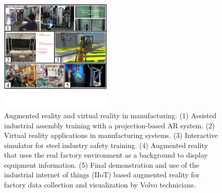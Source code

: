 \documentclass[a4paper,fleqn]{cas-dc}
\begin{document}
\begin{figure}[pos=htb]
	\centering
	\includegraphics[width=0.48\textwidth]{Images/imageandvideo2.pdf}
	\vspace{-5.5em}
	\caption{Augmented reality and virtual reality in manufacturing. (1) Assisted industrial assembly training with a projection-based AR system. (2) Virtual reality applications in manufacturing systems. (3) Interactive simulator for steel industry safety training. (4) Augmented reality that uses the real factory environment as a background to display equipment information. (5) Final demonstration and use of the industrial internet of things (IIoT) based augmented reality for factory data collection and visualization by Volvo technicians.}
	\label{fig:imageandvideo2}
	\vspace{-2em}
\end{figure}

\end{document}
